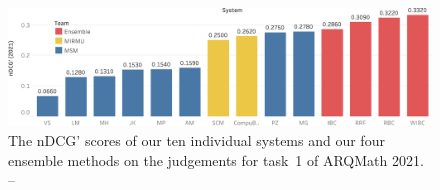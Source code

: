 \begin{figure}
\vspace*{-0.75cm}
\includegraphics{arqmath-2021-accuracies}
\caption{The nDCG' scores of our ten individual systems and our four ensemble methods on the judgements for task~1 of ARQMath 2021. -- \textcite[Figure 10]{novotny2021ensembling}}
\end{figure}
